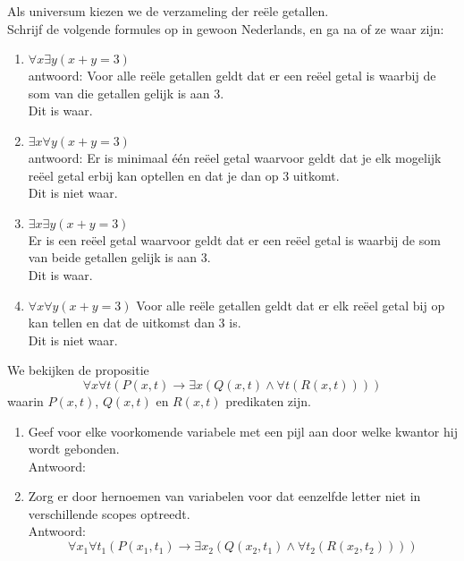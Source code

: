 \begin{answer} %
Als universum kiezen we de verzameling der re\"ele getallen. \\
Schrijf de volgende formules op in gewoon Nederlands, en ga na of ze waar zijn:
\begin{enumerate}[label=\arabic*.]
    \item $\forall x\exists y(x+y=3)$\\
    antwoord: Voor alle reële getallen geldt dat er een reëel getal is waarbij de som van die getallen gelijk is aan 3. \\
    Dit is waar. 
    \item $\exists x\forall y(x+y=3)$ \\
    antwoord: Er is minimaal één reëel getal waarvoor geldt dat je elk mogelijk reëel getal erbij kan optellen en dat je dan op 3 uitkomt. \\
    Dit is niet waar.
    \item $\exists x\exists y(x+y=3)$ \\
    Er is een reëel getal waarvoor geldt dat er een reëel getal is waarbij de som van beide getallen gelijk is aan 3. \\
    Dit is waar.
    \item $\forall x\forall y(x+y=3)$
    Voor alle reële getallen geldt dat er elk reëel getal bij op kan tellen en dat de uitkomst dan 3 is. \\
    Dit is niet waar.
\end{enumerate}
\end{answer}

\begin{answer} %
We bekijken de propositie
$$\forall x\forall t(P(x,t)\rightarrow\exists x(Q(x,t)\wedge\forall t(R(x,t))))$$
waarin $P(x,t)$, $Q(x,t)$ en $R(x,t)$ predikaten zijn.
\begin{enumerate}[label=\arabic*.]
    \item Geef voor elke voorkomende variabele met een pijl aan door welke kwantor hij wordt gebonden.\\
    Antwoord:
    \begin{center}
    \end{center}
    \item Zorg er door hernoemen van variabelen voor dat eenzelfde letter niet in verschillende scopes optreedt.\\
    Antwoord:
    $$\forall x_1\forall t_1(P(x_1,t_1)\rightarrow\exists x_2(Q(x_2,t_1)\wedge\forall t_2(R(x_2,t_2))))$$
\end{enumerate}
\end{answer}

